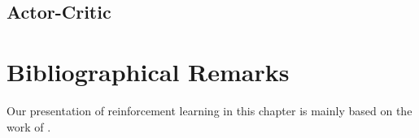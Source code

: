 \subsection{Actor-Critic}



\section*{Bibliographical Remarks}
Our presentation of reinforcement learning in this chapter is mainly based on the work of \citeauthor{sutton2018reinforcement} \cite{sutton2018reinforcement}.